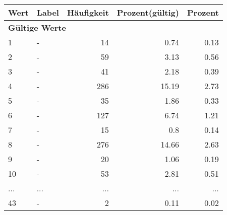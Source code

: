      \begin{longtable}{lXrrr}
     \toprule
     \textbf{Wert} & \textbf{Label} & \textbf{Häufigkeit} & \textbf{Prozent(gültig)} & \textbf{Prozent} \\
     \endhead
     \midrule
     \multicolumn{5}{l}{\textbf{Gültige Werte}}\\
        1 & \multicolumn{1}{X}{-} & %
          \num{14} &
          \num[round-mode=places,round-precision=2]{0.74} &
          \num[round-mode=places,round-precision=2]{0.13} \\
        2 & \multicolumn{1}{X}{-} & %
          \num{59} &
          \num[round-mode=places,round-precision=2]{3.13} &
          \num[round-mode=places,round-precision=2]{0.56} \\
        3 & \multicolumn{1}{X}{-} & %
          \num{41} &
          \num[round-mode=places,round-precision=2]{2.18} &
          \num[round-mode=places,round-precision=2]{0.39} \\
        4 & \multicolumn{1}{X}{-} & %
          \num{286} &
          \num[round-mode=places,round-precision=2]{15.19} &
          \num[round-mode=places,round-precision=2]{2.73} \\
        5 & \multicolumn{1}{X}{-} & %
          \num{35} &
          \num[round-mode=places,round-precision=2]{1.86} &
          \num[round-mode=places,round-precision=2]{0.33} \\
        6 & \multicolumn{1}{X}{-} & %
          \num{127} &
          \num[round-mode=places,round-precision=2]{6.74} &
          \num[round-mode=places,round-precision=2]{1.21} \\
        7 & \multicolumn{1}{X}{-} & %
          \num{15} &
          \num[round-mode=places,round-precision=2]{0.8} &
          \num[round-mode=places,round-precision=2]{0.14} \\
        8 & \multicolumn{1}{X}{-} & %
          \num{276} &
          \num[round-mode=places,round-precision=2]{14.66} &
          \num[round-mode=places,round-precision=2]{2.63} \\
        9 & \multicolumn{1}{X}{-} & %
          \num{20} &
          \num[round-mode=places,round-precision=2]{1.06} &
          \num[round-mode=places,round-precision=2]{0.19} \\
        10 & \multicolumn{1}{X}{-} & %
          \num{53} &
          \num[round-mode=places,round-precision=2]{2.81} &
          \num[round-mode=places,round-precision=2]{0.51} \\
       ... & ... & ... & ... & ... \\
        43 & \multicolumn{1}{X}{-} & %
          \num{2} &
          \num[round-mode=places,round-precision=2]{0.11} &
          \num[round-mode=places,round-precision=2]{0.02} \\


\end{longtable}
